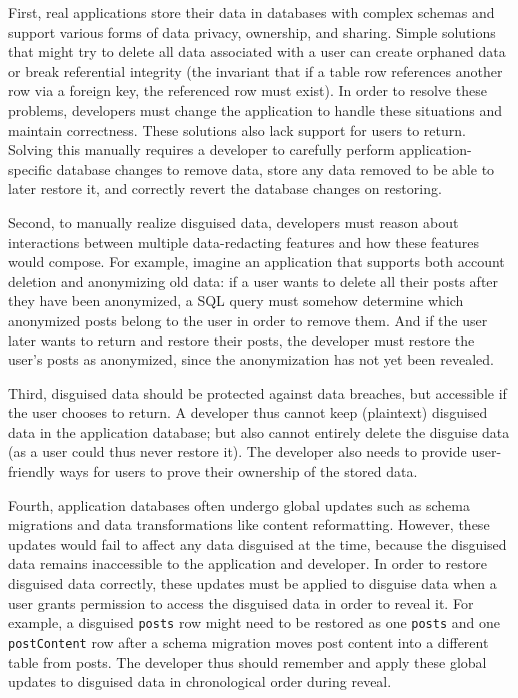 %
First, real applications store their data in databases with complex schemas and
support various forms of data privacy, ownership, and sharing.
%
Simple solutions that might try to delete all data associated with a user can
create orphaned data or break referential integrity (the invariant that if a
table row references another row via a foreign key, the referenced row must
exist). 
%
In order to resolve these problems, developers must change the application to
handle these situations and maintain correctness. These solutions also lack
support for users to return.
%
Solving this manually requires a developer to carefully perform
application-specific database changes to remove data, store any data removed to
be able to later restore it, and correctly revert the database changes on
restoring.
%

%
Second, to manually realize disguised data, developers must reason about
interactions between multiple data-redacting features and how these features
would compose.
%
For example, imagine an application that supports both account deletion and
anonymizing old data: if a user wants to delete all their posts after they have
been anonymized, a SQL query must somehow determine which anonymized posts
belong to the user in order to remove them.
%
And if the user later wants to return and restore their posts, the developer
must restore the user's posts as anonymized, since the anonymization has not yet
been revealed.
%

%
Third, disguised data should be protected against data breaches, but accessible
if the user chooses to return. A developer thus cannot keep (plaintext)
disguised data in the application database; but also cannot entirely delete the
disguise data (as a user could thus never restore it). The developer also needs
to provide user-friendly ways for users to prove their ownership of the stored
data.
%

%
Fourth, application databases often undergo global updates such as schema
migrations and data transformations like content reformatting. However, these
updates would fail to affect any data disguised at the time, because the
disguised data remains inaccessible to the application and developer.  In order
to restore disguised data correctly, these updates must be applied to disguise
data when a user grants permission to access the disguised data in order to
reveal it.
%
For example, a disguised \texttt{posts} row might need to be restored as one 
\texttt{posts} and one \texttt{postContent} row after a schema migration
moves post content into a different table from posts. 
%
The developer thus should remember and apply these global updates to disguised
data in chronological order during reveal.
%


